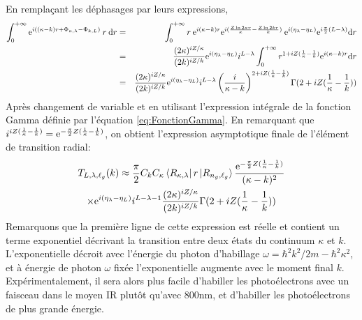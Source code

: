 En remplaçant les déphasages par leurs expressions,
\begin{align}
\int_{0}^{+ \infty} \mathrm{e}^{i((\kappa - k) r + \Phi_{\kappa,\lambda} - \Phi_{k,L})} \: r \: \mathrm{d} r & =&\int_{0}^{+ \infty} r \: \mathrm{e}^{i(\kappa-k)r} \mathrm{e}^{i(\frac{Z \ln 2 \kappa r}{\kappa } - \frac{Z \ln 2 k r}{k})} \: \mathrm{e}^{i(\eta_\lambda - \eta_L)} \mathrm{e}^{i\frac{\pi}{2}(L - \lambda)} \mathrm{d} r \\
& = & \frac{(2\kappa)^{iZ/\kappa}}{(2k)^{iZ/k}} \mathrm{e}^{i(\eta_\lambda - \eta_L)} i^{L-\lambda} \int_{0}^{+ \infty} r^{1+iZ(\frac{1}{\kappa}-\frac{1}{k})} \mathrm{e}^{i(\kappa-k)r} \mathrm{d} r \\
& = & \frac{(2\kappa)^{iZ/\kappa}}{(2k)^{iZ/k}} \mathrm{e}^{i(\eta_\lambda - \eta_L)} i^{L-\lambda} \left( \frac{i}{\kappa-k} \right)^{2+iZ(\frac{1}{\kappa}-\frac{1}{k})} \Gamma(2+iZ(\frac{1}{\kappa}-\frac{1}{k}))
\end{align}
Après changement de variable et en utilisant l'expression intégrale de la fonction Gamma définie par l'équation \ref{eq:FonctionGamma}. En remarquant que $i^{iZ(\frac{1}{\kappa}-\frac{1}{k})} = \mathrm{e}^{-\frac{\pi}{2}Z(\frac{1}{\kappa}-\frac{1}{k})}$, on obtient l'expression asymptotique finale de l'élément de transition radial:
\begin{multline}
T_{L,\lambda,\ell_g}(k) \approx \frac{\pi}{2} C_k C_\kappa \bra{R_{\kappa,\lambda}} r \ket{R_{n_g,\ell_g}} \frac{\mathrm{e}^{-\frac{\pi}{2}Z(\frac{1}{\kappa}-\frac{1}{k})}}{(\kappa - k)^2} \\ \times \mathrm{e}^{i(\eta_\lambda - \eta_L)} i^{L-\lambda -1} \frac{(2\kappa)^{iZ/\kappa}}{(2k)^{iZ/k}} \Gamma(2+iZ(\frac{1}{\kappa}-\frac{1}{k}))
\end{multline}
Remarquons que la première ligne de cette expression est réelle et contient un terme exponentiel décrivant la transition entre deux états du continuum $\kappa$ et $k$. L'exponentielle décroit avec l'énergie du photon d'habillage $\omega = \hbar^2 k^2 / 2m - \hbar^2 \kappa^2$, et à énergie de photon $\omega$ fixée l'exponentielle augmente avec le moment final $k$. Expérimentalement, il sera alors plus facile d'habiller les photoélectrons avec un faisceau dans le moyen IR plutôt qu'avec 800nm, et d'habiller les photoélectrons de plus grande énergie.


